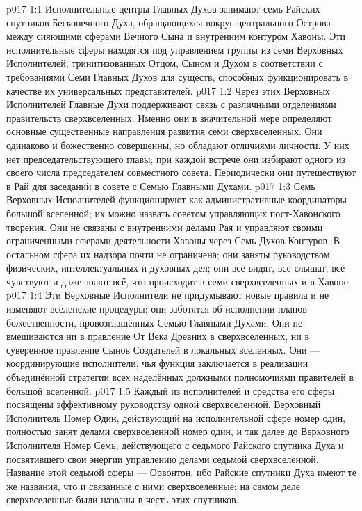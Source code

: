 \vs p017 1:1 Исполнительные центры Главных Духов занимают семь Райских спутников Бесконечного Духа, обращающихся вокруг центрального Острова между сияющими сферами Вечного Сына и внутренним контуром Хавоны. Эти исполнительные сферы находятся под управлением группы из семи Верховных Исполнителей, тринитизованных Отцом, Сыном и Духом в соответствии с требованиями Семи Главных Духов для существ, способных функционировать в качестве их универсальных представителей.
\vs p017 1:2 Через этих Верховных Исполнителей Главные Духи поддерживают связь с различными отделениями правительств сверхвселенных. Именно они в значительной мере определяют основные существенные направления развития семи сверхвселенных. Они одинаково и божественно совершенны, но обладают отличиями личности. У них нет председательствующего главы; при каждой встрече они избирают одного из своего числа председателем совместного совета. Периодически они путешествуют в Рай для заседаний в совете с Семью Главными Духами.
\vs p017 1:3 \pc Семь Верховных Исполнителей функционируют как административные координаторы большой вселенной; их можно назвать советом управляющих пост\hyp{}Хавонского творения. Они не связаны с внутренними делами Рая и управляют своими ограниченными сферами деятельности Хавоны через Семь Духов Контуров. В остальном сфера их надзора почти не ограничена; они заняты руководством физических, интеллектуальных и духовных дел; они всё видят, всё слышат, всё чувствуют и даже знают всё, что происходит в семи сверхвселенных и в Хавоне.
\vs p017 1:4 Эти Верховные Исполнители не придумывают новые правила и не изменяют вселенские процедуры; они заботятся об исполнении планов божественности, провозглашённых Семью Главными Духами. Они не вмешиваются ни в правление От Века Древних в сверхвселенных, ни в суверенное правление Сынов Создателей в локальных вселенных. Они --- координирующие исполнители, чья функция заключается в реализации объединённой стратегии всех наделённых должными полномочиями правителей в большой вселенной.
\vs p017 1:5 Каждый из исполнителей и средства его сферы посвящены эффективному руководству одной сверхвселенной. Верховный Исполнитель Номер Один, действующий на исполнительной сфере номер один, полностью занят делами сверхвселенной номер один, и так далее до Верховного Исполнителя Номер Семь, действующего с седьмого Райского спутника Духа и посвятившего свои энергии управлению делами седьмой сверхвселенной. Название этой седьмой сферы --- Орвонтон, ибо Райские спутники Духа имеют те же названия, что и связанные с ними сверхвселенные; на самом деле сверхвселенные были названы в честь этих спутников.
